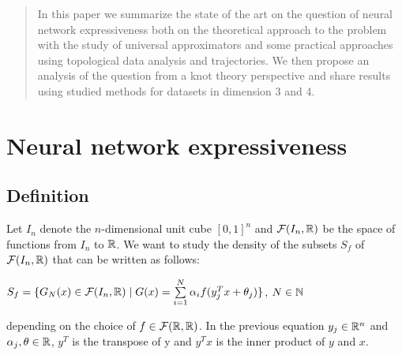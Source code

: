 \documentclass[12pt, a4paper]{article}
\begin{document}
\newpage
\maketitle
\begin{abstract}
  In this paper we summarize the state of the art on the question of neural network expressiveness both on the theoretical approach to the problem with the study of universal approximators and some practical approaches using topological data analysis and trajectories. We then propose an analysis of the question from a knot theory perspective and share results using studied methods for datasets in dimension 3 and 4.
\end{abstract}

\newpage

\setcounter{page}{0}
\setcounter{page}{1}

\tableofcontents

\newpage

\listoffigures

\newpage

\listoftables

\newpage

\thispagestyle{empty}
\mbox{}
\newpage

\setcounter{page}{0}
\setcounter{page}{1}

\section{Neural network expressiveness}

\label{sec:nn_express}

\subsection{Definition}

Let $I_n$ denote the $n$-dimensional unit cube $[0,1]^n$ and $\mathcal{F}(I_n,\mathbb{R})$ be the space of functions from $I_n$ to $\mathbb{R}$. We want to study the density of the subsets $S_f$ of $\mathcal{F}(I_n,\mathbb{R})$ that can be written as follows:\\

\begin{center}
  $S_f = \{G_N(x) \in \mathcal{F}(I_n,\mathbb{R}) \mid G(x) = \sum\limits_{i=1}^{N} \alpha_i f(y_j^T x + \theta_j )\}$, $N \in \mathbb{N} $
\end{center}

depending on the choice of $f \in \mathcal{F}(\mathbb{R},\mathbb{R})$. In the previous equation $y_j \in \mathbb{R}^n$ and $\alpha_j, \theta \in \mathbb{R}$, $y^T$ is the transpose of y and $y^Tx$ is the inner product of $y$ and $x$.\\
\end{document}
